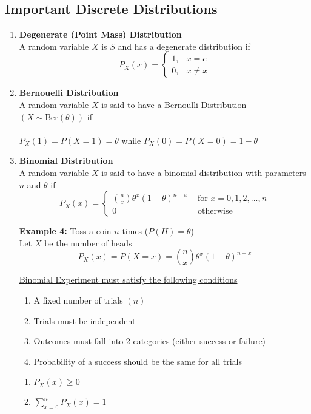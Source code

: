 \documentclass[12pt]{article}
\begin{document}
\subsection{Important Discrete Distributions}
\begin{enumerate}
	\item{
	\textbf{Degenerate (Point Mass) Distribution}\\
	A random variable $X$ is $S$ and has a degenerate distribution if
	$$P_X (x) = 
	\begin{cases}
	1, & x=c\\
	0, & x\neq x
\end{cases}$$
	}
	\item{
	\textbf{Bernouelli Distribution}\\
	A random variable $X$ is said to have a Bernoulli Distribution $(X \sim \text{Ber}(\theta))$ if\\
	\\
	$P_X (1) = P(X = 1) = \theta$ while $P_X (0) = P(X = 0) = 1-\theta$
	}
	\item{
	\textbf{Binomial Distribution}\\
	A random variable $X$ is said to have a binomial distribution with parameters $n$ and $\theta$ if
	$$P_X (x) =
	\begin{cases} 
		\binom{n}{x} \theta^x (1-\theta)^{n-x} & \text{ for } x = 0,1,2,...,n\\
		0 & \text{ otherwise }
	\end{cases}$$
	
	\textbf{Example 4:} Toss a coin $n$ times ($P(H) = \theta$)\\
Let $X$ be the number of heads\\
$$P_X (x) = P(X = x) = \binom{n}{x} \theta^x (1-\theta)^{n-x}$$

\underline{Binomial Experiment must satisfy the following conditions}
\begin{enumerate}
	\item{A fixed number of trials $(n)$}
	\item{Trials must be independent}
	\item{Outcomes must fall into 2 categories (either success or failure)}
	\item{Probability of a success should be the same for all trials}
\end{enumerate}

\begin{tcolorbox}[title=Note]
	\begin{enumerate}
		\item{$P_X (x) \geq 0$}
		\item{$\sum_{x=0}^n P_X (x) = 1$}
	\end{enumerate}
\end{tcolorbox}

}
\end{enumerate}
\end{document}
